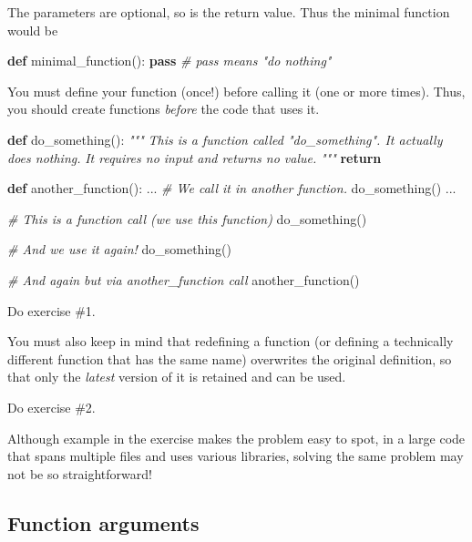 \documentclass[
]{book}
\newenvironment{Shaded}{\begin{snugshade}}{\end{snugshade}}
\newcommand{\CommentTok}[1]{\textcolor[rgb]{0.56,0.35,0.01}{\textit{#1}}}
\newcommand{\ControlFlowTok}[1]{\textcolor[rgb]{0.13,0.29,0.53}{\textbf{#1}}}
\newcommand{\KeywordTok}[1]{\textcolor[rgb]{0.13,0.29,0.53}{\textbf{#1}}}
\newcommand{\NormalTok}[1]{#1}
\begin{document}
The parameters are optional, so is the return value. Thus the minimal function would be

\begin{Shaded}
\begin{Highlighting}[]
\KeywordTok{def}\NormalTok{ minimal\_function():}
    \ControlFlowTok{pass} \CommentTok{\# pass means "do nothing"}
\end{Highlighting}
\end{Shaded}

You must define your function (once!) before calling it (one or more times). Thus, you should create functions \emph{before} the code that uses it.

\begin{Shaded}
\begin{Highlighting}[]
\KeywordTok{def}\NormalTok{ do\_something():}
    \CommentTok{"""}
\CommentTok{    This is a function called "do\_something". It actually does nothing.}
\CommentTok{    It requires no input and returns no value.}
\CommentTok{    """}
    \ControlFlowTok{return}
    
\KeywordTok{def}\NormalTok{ another\_function():}
\NormalTok{    ...}
    \CommentTok{\# We call it in another function.}
\NormalTok{    do\_something()}
\NormalTok{    ...}

\CommentTok{\# This is a function call (we use this function)}
\NormalTok{do\_something()}

\CommentTok{\# And we use it again!}
\NormalTok{do\_something()}

\CommentTok{\# And again but via another\_function call}
\NormalTok{another\_function()}
\end{Highlighting}
\end{Shaded}

Do exercise \#1.

You must also keep in mind that redefining a function (or defining a technically different function that has the same name) overwrites the original definition, so that only the \emph{latest} version of it is retained and can be used.

Do exercise \#2.

Although example in the exercise makes the problem easy to spot, in a large code that spans multiple files and uses various libraries, solving the same problem may not be so straightforward!

\hypertarget{function-arguments}{%
\subsection{Function arguments}\label{function-arguments}}
\end{document}
